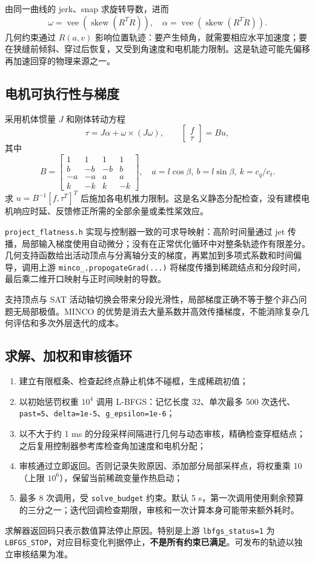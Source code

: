 \documentclass[UTF8,fontset=fandol,a4paper,10pt]{ctexart}
\newcommand{\code}[1]{{\small\nolinkurl{#1}}}
\begin{document}
由同一曲线的 jerk、snap 求旋转导数，进而
\[
 \omega=\operatorname{vee}\!\left(\operatorname{skew}(R^T\dot R)\right),\quad
 \alpha=\operatorname{vee}\!\left(\operatorname{skew}(R^T\ddot R)\right).
\]
几何约束通过 $R(a,v)$ 影响位置轨迹：要产生倾角，就需要相应水平加速度；要在狭缝前倾斜、穿过后恢复，又受到角速度和电机能力限制。这是轨迹可能先偏移再加速回穿的物理来源之一。

\subsection{电机可执行性与梯度}
采用机体惯量 $J$ 和刚体转动方程
\[
 \tau=J\alpha+\omega\times(J\omega),\qquad
 \begin{bmatrix}f\\\tau\end{bmatrix}=B u,
\]
其中
\[
 B=\begin{bmatrix}
 1&1&1&1\\ b&-b&-b&b\\-a&-a&a&a\\ k&-k&k&-k
 \end{bmatrix},\quad
 a=l\cos\beta,\ b=l\sin\beta,\ k=c_q/c_t.
\]
求 $u=B^{-1}[f,\tau^T]^T$ 后施加各电机推力限制。这是名义静态分配检查，没有建模电机响应时延、反馈修正所需的全部余量或柔性桨效应。

\code{project_flatness.h} 实现与控制器一致的可求导映射：高阶时间量通过 jet 传播，局部输入梯度使用自动微分；没有在正常优化循环中对整条轨迹作有限差分。几何支持函数给出活动顶点与分离轴分支的梯度，再累加到多项式系数和时间偏导，调用上游
\code{minco_.propogateGrad(...)} 将梯度传播到稀疏结点和分段时间，最后乘二维开口映射与正时间映射的导数。

支持顶点与 SAT 活动轴切换会带来分段光滑性，局部梯度正确不等于整个非凸问题无局部极值。MINCO 的优势是消去大量系数并高效传播梯度，不能消除复杂几何评估和多次外层迭代的成本。

\subsection{求解、加权和审核循环}
\begin{enumerate}
\item 建立有限框条、检查起终点静止机体不碰框，生成稀疏初值；
\item 以初始惩罚权重 $10^4$ 调用 L-BFGS：记忆长度 32、单次最多 500 次迭代、\code{past=5}、\code{delta=1e-5}、\code{g_epsilon=1e-6}；
\item 以不大于约 1 ms 的分段采样间隔进行几何与动态审核，精确检查穿框结点；之后复用控制器参考库检查角加速度和电机分配；
\item 审核通过立即返回。否则记录失败原因、添加部分局部采样点，将权重乘 10（上限 $10^6$），保留当前稀疏变量作热启动；
\item 最多 8 次调用，受 \code{solve_budget} 约束。默认 5 s，第一次调用使用剩余预算的三分之一；迭代回调检查期限，审核和一次计算本身可能带来额外耗时。
\end{enumerate}
求解器返回码只表示数值算法停止原因。特别是上游 \code{lbfgs_status=1} 为 \code{LBFGS_STOP}，对应目标变化判据停止，\textbf{不是所有约束已满足}。可发布的轨迹以独立审核结果为准。
\end{document}
